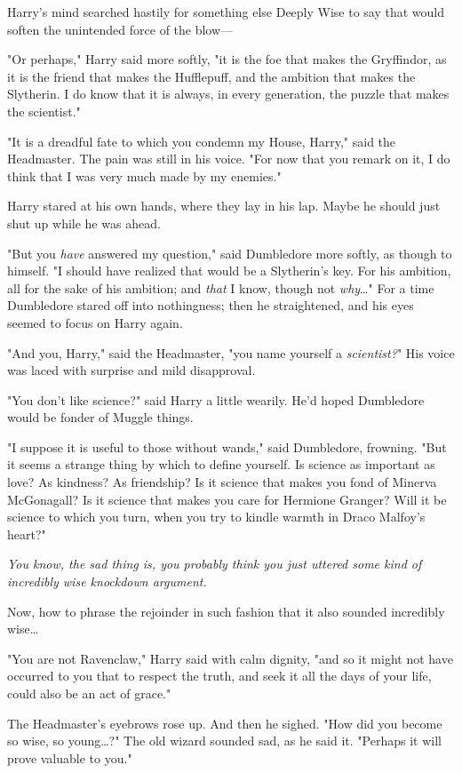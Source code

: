 Harry's mind searched hastily for something else Deeply Wise to say that would 
soften the unintended force of the blow---

"Or perhaps," Harry said more softly, "it is the foe that makes the Gryffindor, 
as it is the friend that makes the Hufflepuff, and the ambition that makes the 
Slytherin. I do know that it is always, in every generation, the puzzle that 
makes the scientist."

"It is a dreadful fate to which you condemn my House, Harry," said the 
Headmaster. The pain was still in his voice. "For now that you remark on it, I 
do think that I was very much made by my enemies."

Harry stared at his own hands, where they lay in his lap. Maybe he should just 
shut up while he was ahead.

"But you \emph{have} answered my question," said Dumbledore more softly, as 
though to himself. "I should have realized that would be a Slytherin's key. For 
his ambition, all for the sake of his ambition; and \emph{that} I know, though 
not \emph{why}{\ldots}" For a time Dumbledore stared off into nothingness; then 
he straightened, and his eyes seemed to focus on Harry again.

"And you, Harry," said the Headmaster, "you name yourself a \emph{scientist?}" 
His voice was laced with surprise and mild disapproval.

"You don't like science?" said Harry a little wearily. He'd hoped Dumbledore 
would be fonder of Muggle things.

"I suppose it is useful to those without wands," said Dumbledore, frowning. 
"But it seems a strange thing by which to define yourself. Is science as 
important as love? As kindness? As friendship? Is it science that makes you 
fond of Minerva McGonagall? Is it science that makes you care for Hermione 
Granger? Will it be science to which you turn, when you try to kindle warmth in 
Draco Malfoy's heart?"

\emph{You know, the sad thing is, you probably think you just uttered some kind 
of incredibly wise knockdown argument.}

Now, how to phrase the rejoinder in such fashion that it also sounded 
incredibly wise{\ldots}

"You are not Ravenclaw," Harry said with calm dignity, "and so it might not 
have occurred to you that to respect the truth, and seek it all the days of 
your life, could also be an act of grace."

The Headmaster's eyebrows rose up. And then he sighed. "How did you become so 
wise, so young{\ldots}?" The old wizard sounded sad, as he said it. "Perhaps it 
will prove valuable to you."

